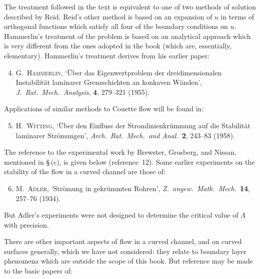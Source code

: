 \noindent The treatment followed in the text is equivalent to one of two methods of solution described by Reid. Reid's other method is based on an expansion of $u$ in terms of orthogonal functions which satisfy all four of the boundary conditions on $u$. Hammerlin's treatment of the problem is based on an analytical approach which is very different from the ones adopted in the book (which are, essentially, elementary). Hammerlin's treatment derives from his earlier paper:

\begin{enumerate}\setcounter{enumi}{3}
\item G.~\textsc{Hammerlin}, `\"Uber das Eigenwertproblem der dreidimensionalen Instabilit\"at laminarer Grenzschichten an konkaven W\"anden', \emph{J.\ Rat.\ Mech.\ Analysis}, \textbf{4}, 279--321 (1955).
\end{enumerate}

\noindent Applications of similar methods to Couette flow will be found in:

\begin{enumerate}\setcounter{enumi}{4}
\item H.~\textsc{Witting}, `\"Uber den Einfluss der Stromlinienkr\"ummung auf die Stabilit\"at laminarer Str\"omungen', \emph{Arch.\ Rat.\ Mech.\ and Anal.}\ \textbf{2}, 243--83 (1958).
\end{enumerate}

\noindent The reference to the experimental work by Brewster, Grosberg, and Nissan, mentioned in \S\,(c), is given below (reference~12). Some earlier experiments on the stability of the flow in a curved channel are those of:

\begin{enumerate}\setcounter{enumi}{5}
\item M.~\textsc{Adler}, `Str\"omung in gekr\"ummten Rohren', \emph{Z.\ angew.\ Math.\ Mech.}\ \textbf{14}, 257--76 (1934).
\end{enumerate}

\noindent But Adler's experiments were not designed to determine the critical value of $\Lambda$ with precision.

\noindent There are other important aspects of flow in a curved channel, and on curved surfaces generally, which we have not considered: they relate to boundary layer phenomena which are outside the scope of this book. But reference may be made to the basic papers of:

